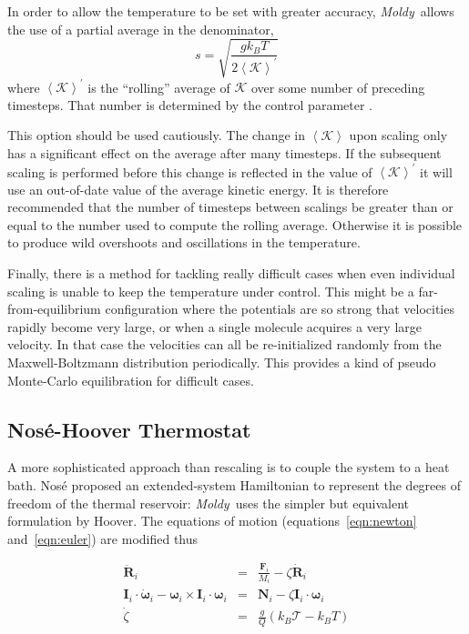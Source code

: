 \documentclass[a4paper,twoside]{report}
\providecommand{\bm}[1]{\mathbf{#1}}
\newcommand{\moldy}{\emph{Moldy}}
\begin{document}
In order to allow the temperature to be set with greater accuracy,
\moldy\ allows the use of a partial average in the denominator,
\begin{equation}
\label{eqn:rav-scaling}
s = \sqrt{\frac{gk_BT}{2\left < \mathcal{K}\right >^\prime}}
\end{equation}
where $\left < \mathcal{K}\right >^\prime$ is the ``rolling'' average of
$\mathcal{K}$ over some number of preceding timesteps.  That number is
determined by the control parameter .   

This option should be used cautiously.  The change in $\left
  <\mathcal{K}\right >$ upon scaling only has a significant effect on
the average after many timesteps. If the subsequent scaling is
performed before this change is reflected in the value of $\left <
  \mathcal{K}\right >^\prime$ it will use an out-of-date value of
the average kinetic energy.  It is therefore recommended that the
number of timesteps between scalings be greater than or equal to the
number used to compute the rolling average.  Otherwise it is possible
to produce wild overshoots and oscillations in the temperature.

Finally, there is a method for tackling really difficult cases when
even individual scaling is unable to keep the temperature under
control.  This might be a far-from-equilibrium configuration where the
potentials are so strong that velocities rapidly become very large,
or when a single molecule acquires a very large velocity.  In that
case the velocities can all be re-initialized randomly from the
Maxwell-Boltzmann distribution periodically.  This provides a kind of
pseudo Monte-Carlo equilibration for difficult cases.

\subsection{Nos{\'e}-Hoover Thermostat}
\label{sec:const-temp}
A more sophisticated approach than rescaling is to couple the system
to a heat bath.  Nos{\'e}\cite{nose:84} proposed an extended-system
Hamiltonian to represent the degrees of freedom of the thermal
reservoir: \moldy\ uses the simpler but equivalent formulation by
Hoover\cite{hoover:85,allen:87}.  The equations of
motion (equations~\ref{eqn:newton} and~\ref{eqn:euler}) are modified thus

\begin{eqnarray}
\label{eqn:nhtherm}
\ddot{\bm{R}}_i &=& \frac{\bm{F}_i}{M_i} - \zeta \dot{\bm{R}}_i
\nonumber \\
\bm{I}_i \cdot \dot{\bm{\omega}}_i - \bm{\omega}_i \times \bm{I}_i
\cdot
\bm{\omega}_i &=& \bm{N}_i - \zeta \bm{I}_i \cdot \bm{\omega}_i \\
\dot{\zeta} &=& \frac{g}{Q}\left ( k_B \mathcal{T} - k_B T \right )
\nonumber
\end{eqnarray}
\end{document}
